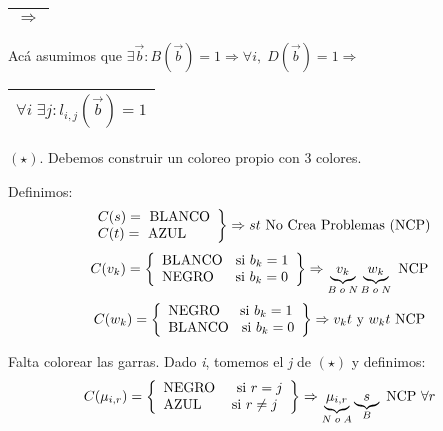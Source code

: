 \documentclass[12pt,a4paper]{report}
\newcounter{neq}
\begin{document}
			\vspace{5mm}
			\begin{tabular}{|c|} \hline $\Rightarrow$ \\\hline \end{tabular}
				\par Acá asumimos que $\exists \overrightarrow{b} : B(\overrightarrow{b}) = 1 \Rightarrow \forall i, \; D(\overrightarrow{b}) = 1 \Rightarrow$ \begin{tabular}{|c|} \hline $\forall i \; \exists j : l_{i, j}(\overrightarrow{b}) = 1$ \\ \hline \end{tabular} $(\star)$. Debemos construir un coloreo propio con 3 colores.
				\vspace{3mm}
				\par Definimos:
				\begin{equation*}
		  		\left.
		  		\begin{array}{l}
		    		C(s) = \textup{ BLANCO} \\
		    		C(t) = \textup{ AZUL}
		  		\end{array}
		 			\right\rbrace
		 			\Rightarrow s t \textup{ No Crea Problemas (NCP)}
				\end{equation*}
				\begin{equation*}
					C(v_{k}) =
					\left\lbrace
		  		\begin{array}{l}
		    		\textup{BLANCO \; si } b_{k} = 1 \\
		    		\textup{NEGRO \; \; si } b_{k} = 0
					\end{array}
		 			\right\rbrace
		 			\Rightarrow \underbrace{v_{k}}_{B \; o \; N} \underbrace{w_{k}}_{B \; o \; N} \textup{ NCP}
				\end{equation*}
				\begin{equation*}
					C(w_{k}) =
		  		\left\lbrace
					\begin{array}{l}
	  		 		\textup{NEGRO \; \, si } b_{k} = 1 \\
	  		 		\textup{BLANCO \; si } b_{k} = 0
					\end{array}
				 	\right\rbrace
				 	\Rightarrow v_{k} t  \textup { y } w_{k} t \textup{ NCP}
				\end{equation*}

				\par Falta colorear las garras. Dado \textit{i}, tomemos el \textit{j} de $(\star )$ y definimos:
				\begin{equation*}
					C(\mu_{i, r}) =
		  		\left\lbrace
					\begin{array}{l}
	  		 		\textup{NEGRO \; \; si } r = j \\
	  		 		\textup{AZUL \; \; \; si } r \neq j
					\end{array}
				 	\right\rbrace
				 	\Rightarrow \underbrace{\mu_{i, r}}_{N \; o \; A} \underbrace{s}_{B} \textup{ NCP } \forall r
				\end{equation*}
\end{document}

